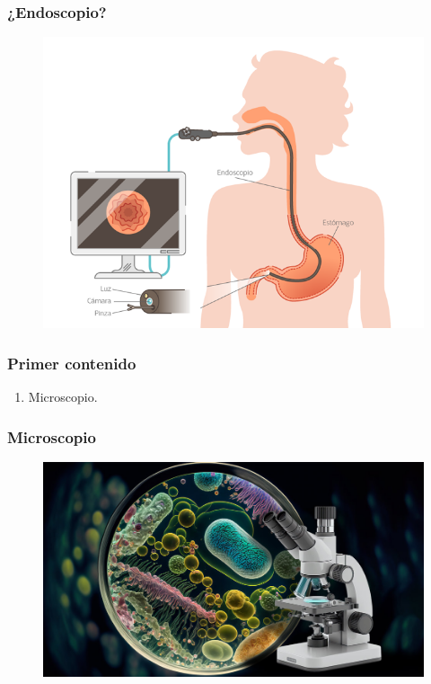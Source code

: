 \documentclass[14pt]{beamer}
\begin{document}
\begin{frame}
\frametitle{¿Endoscopio?}
\begin{figure}
    \centering
    \includegraphics[scale=0.3]{Imagenes/Instrumentacion_03.png}
\end{figure}
\end{frame}
\begin{frame}
\frametitle{Primer contenido}
\vspace*{-1cm}
\begin{enumerate}[<+->]
\conti
\item Microscopio.
\seti
\end{enumerate}
\end{frame}
\begin{frame}
\frametitle{Microscopio}
\begin{figure}
    \centering
    \includegraphics[scale=0.3]{Imagenes/Instrumentacion_06.jpg}
\end{figure}
\end{frame}
\end{document}
